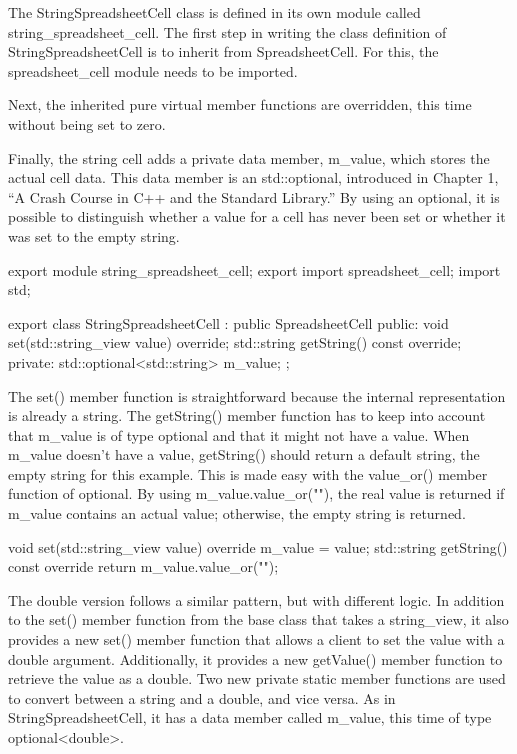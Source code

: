 
The StringSpreadsheetCell class is defined in its own module called string\_spreadsheet\_cell. The first step in writing the class definition of StringSpreadsheetCell is to inherit from SpreadsheetCell. For this, the spreadsheet\_cell module needs to be imported.

Next, the inherited pure virtual member functions are overridden, this time without being set to zero.

Finally, the string cell adds a private data member, m\_value, which stores the actual cell data. This data member is an std::optional, introduced in Chapter 1, “A Crash Course in C++ and the Standard Library.” By using an optional, it is possible to distinguish whether a value for a cell has never been set or whether it was set to the empty string.

\begin{cpp}
export module string_spreadsheet_cell;
export import spreadsheet_cell;
import std;

export class StringSpreadsheetCell : public SpreadsheetCell
{
    public:
        void set(std::string_view value) override;
        std::string getString() const override;
    private:
        std::optional<std::string> m_value;
};
\end{cpp}


The set() member function is straightforward because the internal representation is already a string. The getString() member function has to keep into account that m\_value is of type optional and that it might not have a value. When m\_value doesn’t have a value, getString() should return a default string, the empty string for this example. This is made easy with the value\_or() member function of optional. By using m\_value.value\_or(""), the real value is returned if m\_value contains an actual value; otherwise, the empty string is returned.

\begin{cpp}
void set(std::string_view value) override { m_value = value; }
std::string getString() const override { return m_value.value_or(""); }
\end{cpp}


The double version follows a similar pattern, but with different logic. In addition to the set() member function from the base class that takes a string\_view, it also provides a new set() member function that allows a client to set the value with a double argument. Additionally, it provides a new getValue() member function to retrieve the value as a double. Two new private static member functions are used to convert between a string and a double, and vice versa. As in StringSpreadsheetCell, it has a data member called m\_value, this time of type optional<double>.

